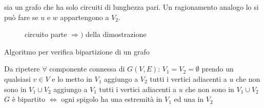 sia un grafo che ha solo circuiti di lunghezza pari. Un ragionamento analogo lo si può fare se
$u$ e $w$ appartengono a $V_2$.
\begin{figure}[!ht]
    \centering
    \caption{circuito parte $\Longrightarrow)$ della dimostrazione}
    \label{fig:circuito_dim}
\end{figure}
\endproof


\begin{algorithm}
\caption{Algoritmo per verifica bipartizione di un grafo}\label{alg:algo_bipartizione}
\begin{algorithmic} 
\STATE Da ripetere $\forall$ componente connessa di $G(V,E)$:
\STATE $V_1 = V_2 = \emptyset$
\STATE prendo un qualsiasi $v \in V$ e lo metto in $V_1$
    \STATE{}
        \STATE aggiungo a $V_2$ tutti i vertici adiacenti a $u$ che non sono in $V_1 \cup V_2$
    \ELSE
        \STATE aggiungo a $V_1$ tutti i vertici adiacenti a $u$ che non sono in $V_1 \cup V_2$
    \ENDIF
\ENDFOR
\STATE $G$ è bipartito $\iff$ ogni spigolo ha una estremità in $V_1$ ed una in $V_2$

\end{algorithmic}
\end{algorithm}


